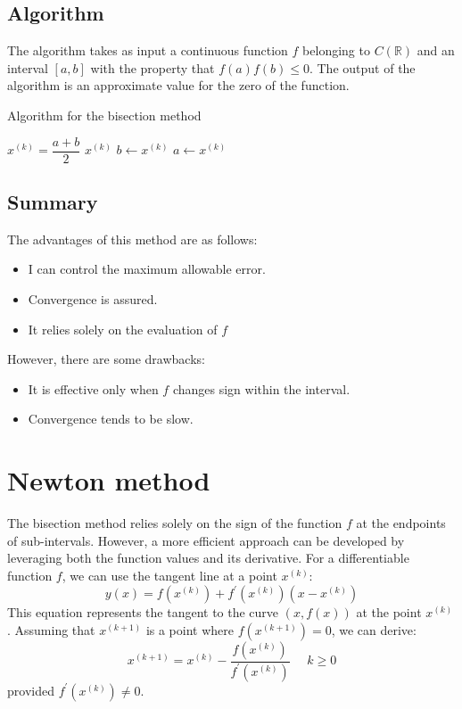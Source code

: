 \documentclass[12pt, a4paper]{report}
\begin{document}
    \subsection{Algorithm}
    The algorithm takes as input a continuous function $f$ belonging to $C(\mathbb{R})$ and an interval $[a,b]$ with the property that $f(a)f(b) \leq 0$. 
    The output of the algorithm is an approximate value for the zero of the function.
    \begin{algorithm}[H]
        \caption{Algorithm for the bisection method}
            \begin{algorithmic}[1]
                    \State $x^{(k)}=\dfrac{a+b}{2}$
                        \State \Return $x^{(k)}$
                        \State $b \leftarrow x^{(k)}$
                    \Else 
                        \State $a \leftarrow x^{(k)}$
                    \EndIf
                \EndFor
            \end{algorithmic}
    \end{algorithm}
    
    \subsection{Summary}
    The advantages of this method are as follows:
    \begin{itemize}
        \item I can control the maximum allowable error.
        \item Convergence is assured.
        \item It relies solely on the evaluation of $f$
    \end{itemize}
    However, there are some drawbacks:
    \begin{itemize}
        \item It is effective only when $f$ changes sign within the interval.
        \item Convergence tends to be slow.
    \end{itemize}
   
    \section{Newton method}
    The bisection method relies solely on the sign of the function $f$ at the endpoints of sub-intervals. 
    However, a more efficient approach can be developed by leveraging both the function values and its derivative.
    For a differentiable function $f$, we can use the tangent line at a point $x^{(k)}$: 
    \[y(x)=f(x^{(k)})+f^{'}(x^{(k)})(x-x^{(k)})\]
    This equation represents the tangent to the curve $(x,f(x))$ at the point $x^{(k)}$. 
    Assuming that $x^{(k+1)}$ is a point where $f(x^{(k+1)})=0$, we can derive:
    \[x^{(k+1)}=x^{(k)}-\dfrac{f(x^{(k)})}{f^{'}(x^{(k)})} \:\:\:\:\:\: k \geq 0\]
    provided $f^{'}(x^{(k)}) \neq 0$. 
    
\end{document}

